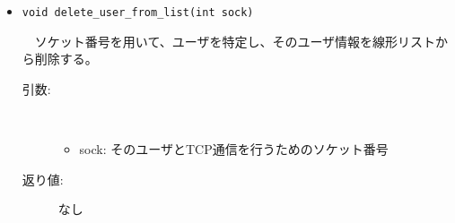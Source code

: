 \documentclass[uplatex,dvipdfmx,11pt,a4paper]{jsarticle} %
\begin{document}
\begin{itemize}

    \item {\tt void delete\_user\_from\_list(int sock)}

        　ソケット番号を用いて、ユーザを特定し、そのユーザ情報を線形リストから削除する。
        \begin{description}
            \item[引数:] \ 

                \begin{itemize}
                    \item sock: そのユーザとTCP通信を行うためのソケット番号
                \end{itemize}
            \item[返り値:] なし
        \end{description}
\end{itemize}
\end{document}
